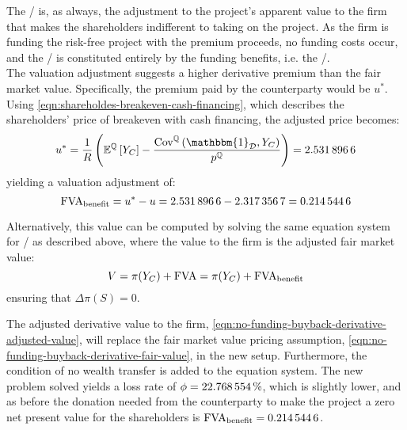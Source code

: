 \documentclass[../main.tex]{subfiles}
\begin{document}
            The \FVA/ is, as always, the adjustment to the project's apparent value to the firm that makes the shareholders indifferent to taking on the project.
            As the firm is funding the risk-free project with the premium proceeds, no funding costs occur, and the \FVA/ is constituted entirely by the funding benefits, i.e. the \FBA/.
            \\
            The valuation adjustment suggests a higher derivative premium than the fair market value. Specifically, the premium paid by the counterparty would be $u^{\ast}$.
            Using \cref{eqn:shareholdes-breakeven-cash-financing}, which describes the shareholders' price of breakeven with cash financing, the adjusted price becomes:
            \begin{equation}
                u^{\ast} = \discountfactor \left(
                    \mathbb{E}^{\rnmeasure}\left[Y_{C}\right] -
                    \frac{\text{Cov}^{\rnmeasure}\left(\mathbbm{1}_{\mathcal{D}},Y_{C}\right)}
                    {p^{\rnmeasure}}
                \right)
                = \num{2.5318966}
            \end{equation}
            yielding a valuation adjustment of:
            \begin{equation}
                \FBA/ = u^{\ast} - u = \num{2.5318966} - \num{2.3173567} = \num{0.2145446}
            \end{equation}

            Alternatively, this value can be computed by solving the same equation system for \FBA/ as described above, where the value to the firm is the adjusted fair market value:
            \begin{equation}
                V = \pi(Y_C) + \FVA/ = \pi(Y_C) + \FBA/
                \label{eqn:no-funding-buyback-derivative-adjusted-value}
            \end{equation}
            ensuring that $\Delta \pi(S) = 0$.

            The adjusted derivative value to the firm, \cref{eqn:no-funding-buyback-derivative-adjusted-value},
            will replace the fair market value pricing assumption, \cref{eqn:no-funding-buyback-derivative-fair-value}, in the new setup.
            Furthermore, the condition of no wealth transfer is added to the equation system.
            The new problem solved yields a loss rate of $\phi = \pct{0.22768554}$,
            which is slightly lower,
            and as before the donation needed from the counterparty to make the project a zero net present value for the shareholders is $\FBA/ = \num{0.2145446}$.
\end{document}
